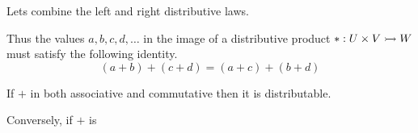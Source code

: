 Lets combine the left and right 
distributive laws.

\begin{center}
\end{center}
Thus the values $a,b,c,d,\ldots $ in the image of a distributive product $*:U\times V\rightarrowtail W$ must 
satisfy the following identity.
\begin{equation}
    \tag{Distributable}
    (a+b)+(c+d) = (a+c)+(b+d)
\end{equation}

\begin{proposition}
    If $+$ in both associative and commutative then it is distributable.

    Conversely, if $+$ is 
\end{proposition}